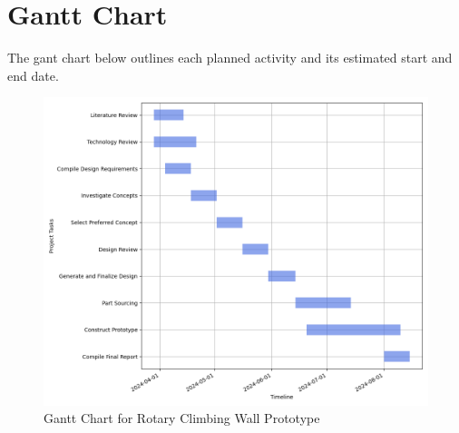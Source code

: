 \section*{Gantt Chart}
The gant chart below outlines each planned activity and its estimated start and end date. 
\begin{figure}[htbp]
    \centering
    \includegraphics[width=1.4\linewidth]{chaps-append/gantt.png}
    \setlength{\leftskip}{-80pt} %
    \caption{Gantt Chart for Rotary Climbing Wall Prototype}
    \label{fig:gantt}
\end{figure}




